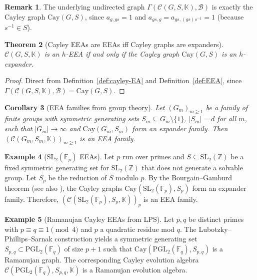 \documentclass[12pt,a4paper]{amsart}
\newtheorem{theorem}{Theorem}[section]
\newtheorem{corollary}[theorem]{Corollary}
\theoremstyle{definition}
\newtheorem{example}[theorem]{Example}
\newtheorem{remark}[theorem]{Remark}
\newcommand{\K}{\mathbb{K}}
\newcommand{\Z}{\mathbb{Z}}
\newcommand{\F}{\mathbb{F}}
\newcommand{\natbasis}{\mathcal{B}}  %
\begin{document}
\begin{remark}
The underlying undirected graph $\varGamma(\mathcal{C}(G,S,\K),\natbasis)$
is exactly the Cayley graph $\mathrm{Cay}(G,S)$, since $a_{g,gs}=1$
and $a_{gs,g}=a_{gs,(gs)s^{-1}}=1$ (because $s^{-1}\in S$).
\end{remark}

\begin{theorem}[Cayley EEAs are EEAs iff Cayley graphs are expanders]
\label{thm:cayley-EEA}
$\mathcal{C}(G,S,\K)$ is an $h$-EEA if and only if the Cayley graph
$\mathrm{Cay}(G,S)$ is an $h$-expander.
\end{theorem}

\begin{proof}
Direct from Definition~\ref{def:cayley-EA} and Definition~\ref{def:EEA},
since $\varGamma(\mathcal{C}(G,S,\K),\natbasis)=\mathrm{Cay}(G,S)$.
\end{proof}

\begin{corollary}[EEA families from group theory]\label{cor:group-EEA}
Let $(G_m)_{m\ge 1}$ be a family of finite groups with symmetric
generating sets $S_m\subseteq G_m\setminus\{1\}$, $|S_m|=d$ for all
$m$, such that $|G_m|\to\infty$ and $\mathrm{Cay}(G_m,S_m)$ form an
expander family.  Then $(\mathcal{C}(G_m,S_m,\K))_{m\ge 1}$ is an EEA
family.
\end{corollary}

\begin{example}[SL$_2(\F_p)$ EEAs]\label{ex:SL2-EEA}
Let $p$ run over primes and $S\subseteq\mathrm{SL}_2(\Z)$ be a fixed
symmetric generating set for $\mathrm{SL}_2(\Z)$ that does not
generate a solvable group.  Let $S_p$ be the reduction of $S$ modulo
$p$.  By the Bourgain--Gamburd theorem \cite{BourgainGamburd2008}
(see also \cite[Chapter~6]{Kowalski2019}), the Cayley graphs
$\mathrm{Cay}(\mathrm{SL}_2(\F_p),S_p)$ form an expander family.
Therefore, $(\mathcal{C}(\mathrm{SL}_2(\F_p),S_p,\K))_p$ is an EEA
family.
\end{example}

\begin{example}[Ramanujan Cayley EEAs from LPS]\label{ex:LPS}
Let $p,q$ be distinct primes with $p\equiv q\equiv 1\pmod{4}$ and $p$
a quadratic residue mod $q$.  The Lubotzky--Phillips--Sarnak
construction \cite{LPS1988} yields a symmetric generating set
$S_{p,q}\subset\mathrm{PGL}_2(\F_q)$ of size $p+1$ such that
$\mathrm{Cay}(\mathrm{PGL}_2(\F_q),S_{p,q})$ is a Ramanujan graph.
The corresponding Cayley evolution algebra
$\mathcal{C}(\mathrm{PGL}_2(\F_q),S_{p,q},\K)$ is a Ramanujan
evolution algebra.
\end{example}
\end{document}
